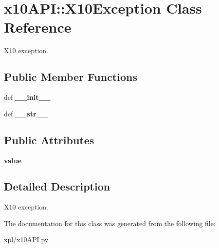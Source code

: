 \hypertarget{classx10API_1_1X10Exception}{
\section{x10API::X10Exception Class Reference}
\label{classx10API_1_1X10Exception}
}
X10 exception.  


\subsection*{Public Member Functions}
\begin{CompactItemize}
\item 
\hypertarget{classx10API_1_1X10Exception_033a895f90bdb03c500be02471701831}{
def \textbf{\_\-\_\-init\_\-\_\-}}
\label{classx10API_1_1X10Exception_033a895f90bdb03c500be02471701831}

\item 
\hypertarget{classx10API_1_1X10Exception_a9a0adf2ba11276fecd3d7d0f759a8c9}{
def \textbf{\_\-\_\-str\_\-\_\-}}
\label{classx10API_1_1X10Exception_a9a0adf2ba11276fecd3d7d0f759a8c9}

\end{CompactItemize}
\subsection*{Public Attributes}
\begin{CompactItemize}
\item 
\hypertarget{classx10API_1_1X10Exception_ea0d93a4bd33db7e6f416fe28d739c84}{
\textbf{value}}
\label{classx10API_1_1X10Exception_ea0d93a4bd33db7e6f416fe28d739c84}

\end{CompactItemize}


\subsection{Detailed Description}
X10 exception. 

The documentation for this class was generated from the following file:\begin{CompactItemize}
\item 
xpl/x10API.py\end{CompactItemize}
